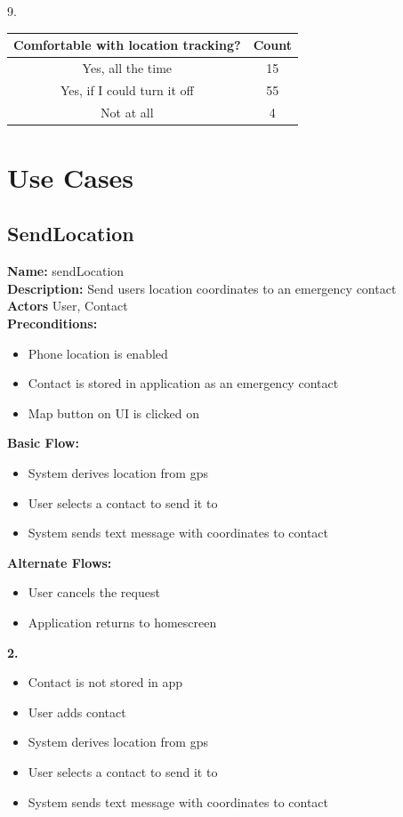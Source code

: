 \documentclass[a4paper]{report}
\begin{document}
9. 	\begin{tabular}{|c|c|}
	\hline
	Comfortable with location tracking? & Count\\
	\hline
	Yes, all the time & 15 \\
	\hline
	Yes, if I could turn it off & 55 \\
	\hline
	Not at all & 4 \\
	\hline
\end{tabular}
\chapter{Use Cases}
\section{SendLocation}
\textbf{Name:} sendLocation \\
\textbf{Description:} Send users location coordinates to an emergency contact \\
\textbf{Actors} User, Contact\\
\textbf{Preconditions:}
\begin{itemize}
	\item Phone location is enabled
	\item Contact is stored in application as an emergency contact
	\item Map button on UI is clicked on
\end{itemize}
\textbf{Basic Flow:} 
\begin{itemize}
	\item System derives location from gps
	\item User selects a contact to send it to
	\item System sends text message with coordinates to contact
\end{itemize}
\textbf{Alternate Flows:}
\begin{itemize}
	\item User cancels the request
	\item Application returns to homescreen 
\end{itemize}
\textbf{2.}
\begin{itemize}
	\item Contact is not stored in app
	\item User adds contact
	\item System derives location from gps
	\item User selects a contact to send it to
	\item System sends text message with coordinates to contact
\end{itemize}
\end{document}
